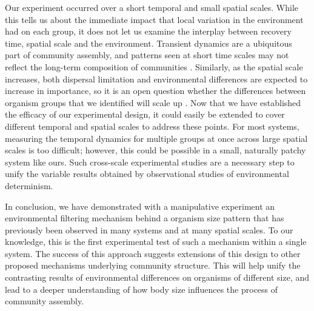 Our experiment occurred over a short temporal and small spatial scales.
While this tells us about the immediate impact that local variation in
the environment had on each group, it does not let us examine the
interplay between recovery time, spatial scale and the environment.
Transient dynamics are a ubiquitous part of community assembly, and
patterns seen at short time scales may not reflect the long-term
composition of communities \citep{Drake1990}. Similarly, as the spatial
scale increases, both dispersal limitation and environmental differences
are expected to increase in importance, so it is an open question
whether the differences between organism groups that we identified will
scale up \citep{DeBie2012a}. Now that we have established the efficacy
of our experimental design, it could easily be extended to cover
different temporal and spatial scales to address these points. For most
systems, measuring the temporal dynamics for multiple groups at once
across large spatial scales is too difficult; however, this could be
possible in a small, naturally patchy system like ours. Such cross-scale
experimental studies are a necessary step to unify the variable results
obtained by observational studies of environmental determinism.

In conclusion, we have demonstrated with a manipulative experiment an
environmental filtering mechanism behind a organism size pattern that
has previously been observed in many systems and at many spatial scales.
To our knowledge, this is the first experimental test of such a
mechanism within a single system. The success of this approach suggests
extensions of this design to other proposed mechanisms underlying
community structure. This will help unify the contrasting results of
environmental differences on organisms of different size, and lead to a
deeper understanding of how body size influences the process of
community assembly.

